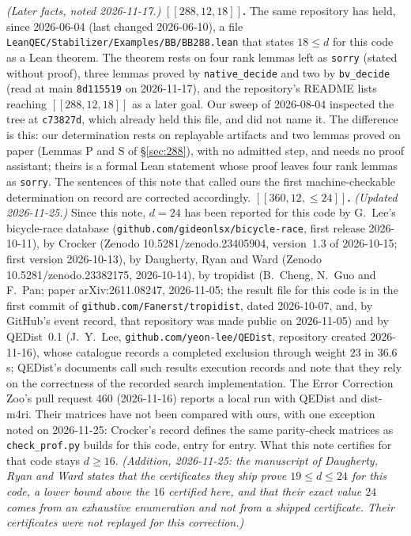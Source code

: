\documentclass[11pt]{amsart}
\theoremstyle{plain}
\theoremstyle{definition}
\theoremstyle{remark}
\begin{document}
\emph{(Later facts, noted 2026-11-17.)} \textbf{$[[288,12,18]]$.} The same
repository has held, since 2026-06-04 (last changed 2026-06-10), a file
\texttt{LeanQEC/Stabilizer/Examples/BB/BB288.lean} that states $18\le d$ for this
code as a Lean theorem. The theorem rests on four rank lemmas left as
\texttt{sorry} (stated without proof), three lemmas proved by
\texttt{native\_decide} and two by
\texttt{bv\_decide} (read at main \texttt{8d115519} on 2026-11-17), and the
repository's README lists reaching $[[288,12,18]]$ as a later goal. Our sweep
of 2026-08-04 inspected the tree at \texttt{c73827d}, which already held this
file, and did not name it. The difference is this: our determination rests on
replayable artifacts and two lemmas proved on paper (Lemmas P and S of
\S\ref{sec:288}), with no admitted step, and needs no proof assistant; theirs
is a formal Lean statement whose proof leaves four rank lemmas as
\texttt{sorry}. The sentences of
this note that called ours the first machine-checkable determination on record
are corrected accordingly. \textbf{$[[360,12,\le24]]$.} \emph{(Updated
2026-11-25.)} Since this note, $d=24$
has been reported for this code by G.~Lee's bicycle-race database
(\texttt{github.com/gideonlsx/bicycle-race}, first release 2026-10-11), by
Crocker (Zenodo 10.5281/zenodo.23405904, version~1.3 of 2026-10-15; first
version 2026-10-13), by Daugherty, Ryan and Ward (Zenodo
10.5281/zenodo.23382175, 2026-10-14), by tropidist (B.~Cheng, N.~Guo and
F.~Pan; paper arXiv:2611.08247, 2026-11-05; the result file for this code is
in the first commit of \texttt{github.com/Fanerst/tropidist}, dated
2026-10-07, and, by GitHub's event record, that repository was made public on
2026-11-05) and by
QEDist~0.1 (J.~Y.~Lee, \texttt{github.com/yeon-lee/QEDist}, repository
created 2026-11-16), whose catalogue records a completed exclusion through weight
$23$ in $36.6$\,s; QEDist's documents call such results execution records
and note that they rely on the correctness of the recorded search
implementation. The Error Correction Zoo's pull request 460 (2026-11-16)
reports a local run with QEDist and
dist-m4ri. Their matrices have not been compared with ours, with one
exception noted on 2026-11-25: Crocker's record defines the same parity-check
matrices as \texttt{check\_prof.py} builds for this code, entry for entry. What this note
certifies for that code stays $d\ge16$. \emph{(Addition, 2026-11-25: the
manuscript of Daugherty, Ryan and Ward states that the certificates they ship
prove $19\le d\le24$ for this code, a lower bound above the $16$ certified
here, and that their exact value $24$ comes from an exhaustive enumeration and
not from a shipped certificate. Their certificates were not replayed for this
correction.)}
\end{document}
